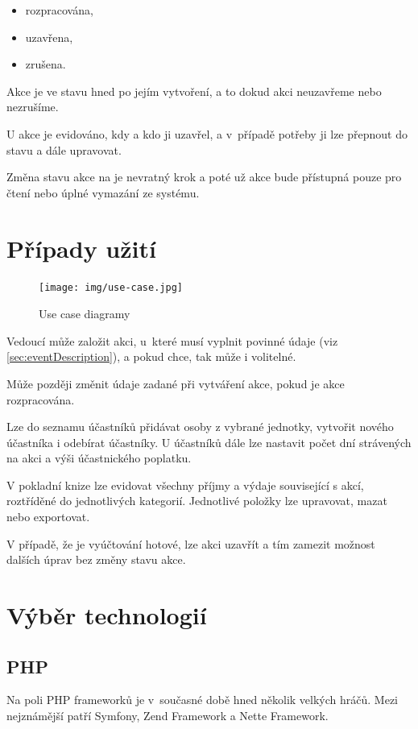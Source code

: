 \documentclass[thesis=B,czech]{FITthesis}[2011/06/14]
\begin{document}
 \begin{itemize}
 	\item rozpracována,
	\item uzavřena,
	\item zrušena.
 \end{itemize} 
 
Akce je ve stavu  hned po jejím vytvoření, a to dokud akci neuzavřeme nebo nezrušíme.

U  akce je evidováno, kdy a kdo ji uzavřel, a v~případě potřeby ji lze přepnout do stavu  a dále upravovat.

Změna stavu akce na  je nevratný krok a poté už akce bude přístupná pouze pro čtení nebo úplné vymazání ze systému.

\section{Případy užití}
\begin{figure}[h]\centering
 	\texttt{[image: img/use-case.jpg]}
 	\caption[Případy užití]{Use case diagramy}\label{fig:use-case}
\end{figure}
Vedoucí může založit akci, u~které musí vyplnit povinné údaje (viz \ref{sec:eventDescription}), a pokud chce, tak může i volitelné.

Může později změnit údaje zadané při vytváření akce, pokud je akce rozpracována. 

Lze do seznamu účastníků přidávat osoby z vybrané jednotky, vytvořit nového účastníka i odebírat účastníky. U účastníků dále lze nastavit počet dní strávených na akci a výši účastnického poplatku. 

V pokladní knize lze evidovat všechny příjmy a výdaje související s akcí, roztříděné do jednotlivých kategorií. Jednotlivé položky lze upravovat, mazat nebo exportovat.

V případě, že je vyúčtování hotové, lze akci uzavřít a tím zamezit možnost dalších úprav bez změny stavu akce.

\section{Výběr technologií}
\subsection{PHP}
Na poli PHP frameworků je v~současné době hned několik velkých hráčů. Mezi nejznámější patří Symfony, Zend Framework a Nette Framework.
\end{document}
